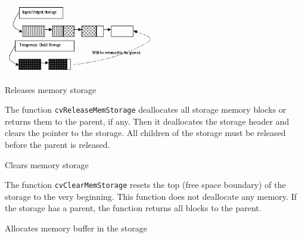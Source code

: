 \includegraphics[width=0.5\textwidth]{pics/memstorage2.png}

\label{ReleaseMemStorage}

Releases memory storage


\begin{description}
\end{description}

The function \texttt{cvReleaseMemStorage} deallocates all storage memory
blocks or returns them to the parent, if any. Then it deallocates the
storage header and clears the pointer to the storage. All children of
the storage must be released before the parent is released.

\label{ClearMemStorage}

Clears memory storage


\begin{description}
\end{description}

The function \texttt{cvClearMemStorage} resets the top (free space
boundary) of the storage to the very beginning. This function does not
deallocate any memory. If the storage has a parent, the function returns
all blocks to the parent.

\label{MemStorageAlloc}

Allocates memory buffer in the storage


\begin{description}
\end{description}

